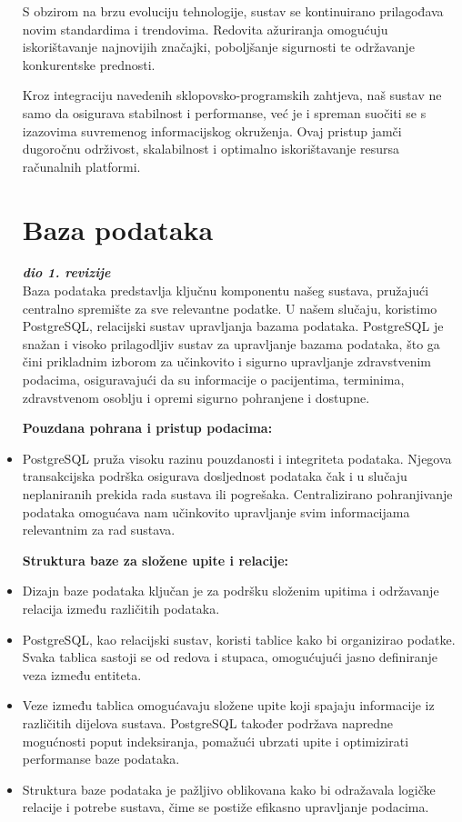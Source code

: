 \begin{itemize}
S obzirom na brzu evoluciju tehnologije, sustav se kontinuirano prilagođava novim standardima i trendovima. Redovita ažuriranja omogućuju iskorištavanje najnovijih značajki, poboljšanje sigurnosti te održavanje konkurentske prednosti.\newline

Kroz integraciju navedenih sklopovsko-programskih zahtjeva, naš sustav ne samo da osigurava stabilnost i performanse, već je i spreman suočiti se s izazovima suvremenog informacijskog okruženja. Ovaj pristup jamči dugoročnu održivost, skalabilnost i optimalno iskorištavanje resursa računalnih platformi.

 


		\section{Baza podataka}
			
			\textbf{\textit{dio 1. revizije}}\\
			
Baza podataka predstavlja ključnu komponentu našeg sustava, pružajući centralno spremište za sve relevantne podatke. U našem slučaju, koristimo PostgreSQL, relacijski sustav upravljanja bazama podataka. PostgreSQL je snažan i visoko prilagodljiv sustav za upravljanje bazama podataka, što ga čini prikladnim izborom za učinkovito i sigurno upravljanje zdravstvenim podacima, osiguravajući da su informacije o pacijentima, terminima, zdravstvenom osoblju i opremi sigurno pohranjene i dostupne. 



\textbf{Pouzdana pohrana i pristup podacima:}
\item PostgreSQL pruža visoku razinu pouzdanosti i integriteta podataka. Njegova transakcijska podrška osigurava dosljednost podataka čak i u slučaju neplaniranih prekida rada sustava ili pogrešaka.
Centralizirano pohranjivanje podataka omogućava nam učinkovito upravljanje svim informacijama relevantnim za rad sustava.

\textbf{Struktura baze za složene upite i relacije:}
\item Dizajn baze podataka ključan je za podršku složenim upitima i održavanje relacija između različitih podataka.
\item PostgreSQL, kao relacijski sustav, koristi tablice kako bi organizirao podatke. Svaka tablica sastoji se od redova i stupaca, omogućujući jasno definiranje veza između entiteta.
\item Veze između tablica omogućavaju složene upite koji spajaju informacije iz različitih dijelova sustava. 
PostgreSQL također podržava napredne mogućnosti poput indeksiranja, pomažući ubrzati upite i optimizirati performanse baze podataka.
\item  Struktura baze podataka je pažljivo oblikovana kako bi odražavala logičke relacije i potrebe sustava, čime se postiže efikasno upravljanje podacima.



\end{itemize}
